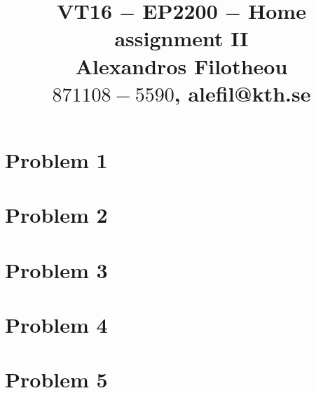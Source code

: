 \documentclass[oneside,12pt]{article}
\title{VT16 $-$ EP2200 $-$ Home assignment II \\ Alexandros Filotheou \\ $871108-5590$, alefil@kth.se }
\date{}
\begin{document}
	\maketitle

  \section{Problem 1}
  
  \newpage
  \section{Problem 2}
  
  \newpage
  \section{Problem 3}
  
  \newpage
  \section{Problem 4}
  
  \newpage
  \section{Problem 5}
  
\end{document}
